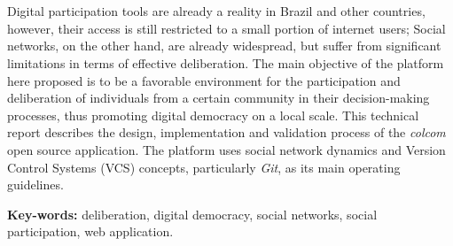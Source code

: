 \section*{} 
\noindent Digital participation tools are already a reality in Brazil and other countries, however, their access is still restricted to a small portion of internet users; Social networks, on the other hand, are already widespread, but suffer from significant limitations in terms of effective deliberation. The main objective of the platform here proposed is to be a favorable environment for the participation and deliberation of individuals from a certain community in their decision-making processes, thus promoting digital democracy on a local scale. This technical report describes the design, implementation and validation process of the \textit{colcom} open source application. The platform uses social network dynamics and Version Control Systems (VCS) concepts, particularly \textit{Git}, as its main operating guidelines.

{\bf Key-words:} deliberation, digital democracy, social networks, social participation, web application.